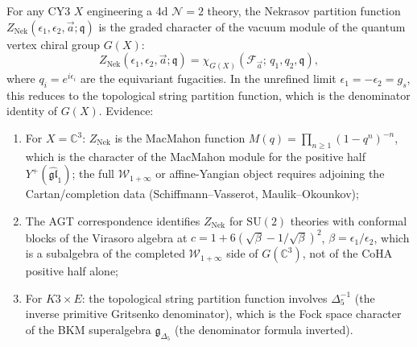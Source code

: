 \begin{conjecture}
\label{conj:phys-nekrasov-character}
\ClaimStatusConjectured
For any CY3 $X$ engineering a 4d $\mathcal{N}=2$ theory, the Nekrasov partition
function $Z_{\mathrm{Nek}}(\epsilon_1, \epsilon_2, \vec{a}; \mathfrak{q})$ is the
graded character of the vacuum module of the quantum vertex chiral group $G(X)$:
\begin{equation}\label{eq:phys-nekrasov-character}
 Z_{\mathrm{Nek}}(\epsilon_1, \epsilon_2, \vec{a}; \mathfrak{q})
 = \chi_{G(X)}(\mathcal{F}_{\vec{a}};\, q_1, q_2, \mathfrak{q}),
\end{equation}
where $q_i = e^{i\epsilon_i}$ are the equivariant fugacities. In the
unrefined limit $\epsilon_1 = -\epsilon_2 = g_s$, this reduces to the
topological string partition function, which is the denominator identity of
$G(X)$. Evidence:
\begin{enumerate}[label=(\arabic*)]
\item For $X = \mathbb{C}^3$: $Z_{\mathrm{Nek}}$ is the MacMahon function
 $M(q) = \prod_{n\geq 1}(1-q^n)^{-n}$, which is the character of the MacMahon
 module for the positive half $Y^+(\widehat{\mathfrak{gl}}_1)$; the full
 $\mathcal{W}_{1+\infty}$ or affine-Yangian object requires adjoining the
 Cartan/completion data (Schiffmann--Vasserot, Maulik--Okounkov);
\item The AGT correspondence identifies $Z_{\mathrm{Nek}}$ for $\mathrm{SU}(2)$
 theories with conformal blocks of the Virasoro algebra at $c = 1 + 6(\sqrt{\beta} - 1/\sqrt{\beta})^2$, $\beta = \epsilon_1/\epsilon_2$, which is a subalgebra
 of the completed $\mathcal{W}_{1+\infty}$ side of $G(\mathbb{C}^3)$, not of
 the CoHA positive half alone;
 \item For $K3 \times E$: the topological string partition function involves
 $\Delta_5^{-1}$ (the inverse primitive Gritsenko denominator), which is the Fock space
 character of the BKM superalgebra $\mathfrak{g}_{\Delta_5}$ (the denominator
 formula inverted).
\end{enumerate}
\end{conjecture}

